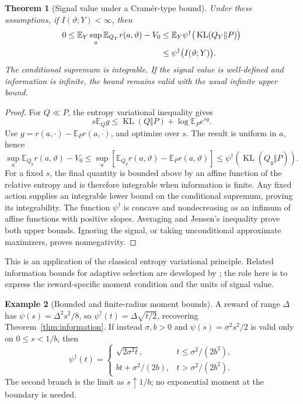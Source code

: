 \documentclass[11pt]{article}
\theoremstyle{plain}
\newtheorem{theorem}{Theorem}[section]
\theoremstyle{definition}
\newtheorem{example}[theorem]{Example}
\theoremstyle{remark}
\newcommand{\E}{\mathbb E}
\DeclareMathOperator{\KL}{KL}
\begin{document}
\begin{theorem}[Signal value under a Cram\'er-type bound]
\label{thm:cramerinformation}
Under these assumptions, if \(I(\vartheta;Y)<\infty\), then
\begin{align}
0\le\E_Y\sup_a\E_{Q_Y}r(a,\vartheta)-V_0
&\le\E_Y\psi^\dagger\big(\KL(Q_Y\Vert P)\big)\notag\\
&\le\psi^\dagger\big(I(\vartheta;Y)\big).
\label{eq:cramerinformation}
\end{align}
The conditional supremum is integrable. If the signal value is
well-defined and information is infinite, the bound remains valid
with the usual infinite upper bound.
\end{theorem}
\begin{proof}
For \(Q\ll P\), the entropy variational inequality gives
\[
s\E_Q g\le\KL(Q\Vert P)+\log\E_Pe^{sg}.
\]
Use \(g=r(a,\cdot)-\E_Pr(a,\cdot)\), and optimize over \(s\).
The result is uniform in \(a\), hence
\[
\sup_a\E_{Q_y}r(a,\vartheta)-V_0
\le\sup_a[\E_{Q_y}r(a,\vartheta)-\E_Pr(a,\vartheta)]
\le\psi^\dagger(\KL(Q_y\Vert P)).
\]
For a fixed \(s\), the final quantity is bounded above by an affine
function of the relative entropy and is therefore integrable when
information is finite. Any fixed action supplies an integrable lower
bound on the conditional supremum, proving its integrability.
The function \(\psi^\dagger\) is concave and nondecreasing as an
infimum of affine functions with positive slopes. Averaging and Jensen's
inequality prove both upper bounds. Ignoring the signal, or taking
unconditional approximate maximizers, proves nonnegativity.
\end{proof}

This is an application of the classical entropy variational principle.
Related information bounds for adaptive selection are developed by
\citet{RussoZou2016}; the role here is to express the reward-specific
moment condition and the units of signal value.

\begin{example}[Bounded and finite-radius moment bounds]
A reward of range \(\Delta\) has
\(\psi(s)=\Delta^2s^2/8\), so
\(\psi^\dagger(t)=\Delta\sqrt{t/2}\), recovering
Theorem~\ref{thm:information}. If instead \(\sigma,b>0\) and
\(\psi(s)=\sigma^2s^2/2\) is valid only on \(0\le s<1/b\), then
\[
\psi^\dagger(t)=
\begin{cases}
\sqrt{2\sigma^2t},&t\le\sigma^2/(2b^2),\\
bt+\sigma^2/(2b),&t>\sigma^2/(2b^2).
\end{cases}
\]
The second branch is the limit as \(s\uparrow1/b\); no exponential
moment at the boundary is needed.
\end{example}
\end{document}
